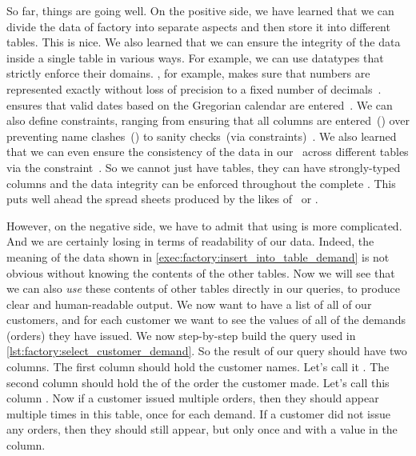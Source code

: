 %
%
%
So far, things are going well.
On the positive side, we have learned that we can divide the data of factory into separate aspects and then store it into different tables.
This is nice.
We also learned that we can ensure the integrity of the data inside a single table in various ways.
For example, we can use datatypes that strictly enforce their domains.
, for example, makes sure that numbers are represented exactly without loss of precision to a fixed number of decimals~\cite{PGDG:PD:NT}.
 ensures that valid dates based on the Gregorian calendar are entered~\cite{PGDG:PD:HU,G1582IG}.
We can also define constraints, ranging from ensuring that all columns are entered~() over preventing name clashes~() to sanity checks~(via  constraints)~\cite{PGDG:PD:C}.
We also learned that we can even ensure the consistency of the data in our \db\ across different tables via the  constraint~\cite{PGDG:PD:FK}.
So we cannot just have tables, they can have strongly-typed columns and the data integrity can be enforced throughout the complete \db.
This puts  well ahead the spread sheets produced by the likes of \microsoftExcel\ or \libreofficeCalc.

However, on the negative side, we have to admit that using  is more complicated.
And we are certainly losing in terms of readability of our data.
Indeed, the meaning of the  data shown in \cref{exec:factory:insert_into_table_demand} is not obvious without knowing the contents of the other tables.
Now we will see that we can also \emph{use} these contents of other tables directly in our queries, to produce clear and human-readable output.%
%
%
%
%
We now want to have a list of all of our customers, and for each customer we want to see the  values of all of the demands (orders) they have issued.
We now step-by-step build the query used in \cref{lst:factory:select_customer_demand}.
So the result of our query should have two columns.
The first column should hold the customer names.
Let's call it .
The second column should hold the  of the order the customer made.
Let's call this column .
Now if a customer issued multiple orders, then they should appear multiple times in this table, once for each demand.
If a customer did not issue any orders, then they should still appear, but only once and with a  value in the  column.

